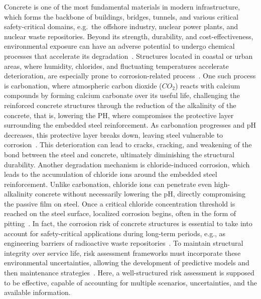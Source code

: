
Concrete is one of the most fundamental materials in modern infrastructure, which forms the backbone of buildings, bridges, tunnels, and various critical safety-critical domains, e.g.~the offshore industry, nuclear power plants, and nuclear waste repositories.
Beyond its strength, durability, and cost-effectiveness, environmental exposure can have an adverse potential to undergo chemical processes that accelerate its degradation~\cite{GLASSER2008226}. Structures located in coastal or urban areas, where humidity, chlorides, and fluctuating temperatures accelerate deterioration, are especially prone to corrosion-related process~\cite{qu2021durability}.
One such process is carbonation, where atmospheric carbon dioxide ($CO_2$) reacts with calcium compounds by forming calcium carbonate over its useful life, challenging the reinforced concrete structures through the reduction of the alkalinity of the concrete, that is, lowering the PH, where compromises the protective layer surrounding the embedded steel reinforcement.
As carbonation progresses and pH decreases, this protective layer breaks down, leaving steel vulnerable to corrosion~\cite{carbonation}.
This deterioration can lead to cracks, cracking, and weakening of the bond between the steel and concrete, ultimately diminishing the structural durability.
Another degradation mechanism is chloride-induced corrosion, which leads to the accumulation of chloride ions around the embedded steel reinforcement. Unlike carbonation, chloride ions can penetrate even high-alkalinity concrete without necessarily lowering the pH, directly compromising the passive film on steel.
Once a critical chloride concentration threshold is reached on the steel surface, localized corrosion begins, often in the form of pitting~\cite{shi2012durability}.
In fact, the corrosion risk of concrete structures is essential to take into account for safety-critical applications during long-term periods, e.g., as engineering barriers of radioactive waste repositories~\cite{walton1990models}.
To maintain structural integrity over service life, risk assessment frameworks must incorporate these environmental uncertainties, allowing the development of predictive models and then maintenance strategies~\cite{lindborg2018climate}.
Here, a well-structured risk assessment is supposed to be effective, capable of accounting for multiple scenarios, uncertainties, and the available information.\\

